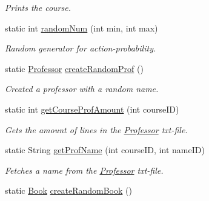 \begin{DoxyCompactItemize}
\begin{DoxyCompactList}\small\item\em Prints the course. \end{DoxyCompactList}\item 
static int \hyperlink{classTXTReader_a0259986abc13a647e9993a81b411c88e}{random\+Num} (int min, int max)
\begin{DoxyCompactList}\small\item\em Random generator for action-\/probability. \end{DoxyCompactList}\item 
\hypertarget{classTXTReader_ad93e1af501d95cc21916efee0a641968}{}static \hyperlink{classProfessor}{Professor} \hyperlink{classTXTReader_ad93e1af501d95cc21916efee0a641968}{create\+Random\+Prof} ()\label{classTXTReader_ad93e1af501d95cc21916efee0a641968}

\begin{DoxyCompactList}\small\item\em Created a professor with a random name. \end{DoxyCompactList}\item 
static int \hyperlink{classTXTReader_a18295e9e805a64f52a8b164f0698d2a5}{get\+Course\+Prof\+Amount} (int course\+I\+D)
\begin{DoxyCompactList}\small\item\em Gets the amount of lines in the \hyperlink{classProfessor}{Professor} txt-\/file. \end{DoxyCompactList}\item 
static String \hyperlink{classTXTReader_a2d77be92793ade8320fddd1c2cd978fe}{get\+Prof\+Name} (int course\+I\+D, int name\+I\+D)
\begin{DoxyCompactList}\small\item\em Fetches a name from the \hyperlink{classProfessor}{Professor} txt-\/file. \end{DoxyCompactList}\item 
\hypertarget{classTXTReader_ab9a5af64c8939de376aa520d10c55d9a}{}static \hyperlink{classBook}{Book} \hyperlink{classTXTReader_ab9a5af64c8939de376aa520d10c55d9a}{create\+Random\+Book} ()\label{classTXTReader_ab9a5af64c8939de376aa520d10c55d9a}


\end{DoxyCompactItemize}

